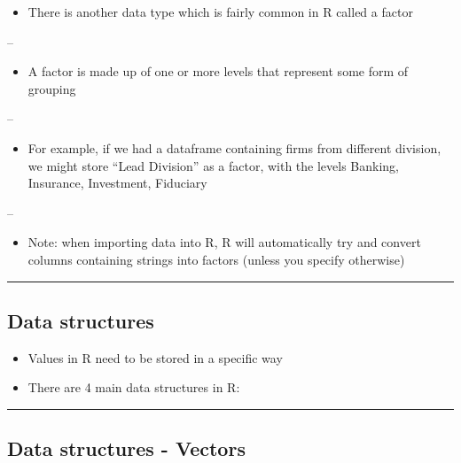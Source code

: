 \documentclass[]{article}
\providecommand{\tightlist}{%
  \setlength{\itemsep}{0pt}\setlength{\parskip}{0pt}}
\begin{document}
\begin{itemize}
\tightlist
\item
  There is another data type which is fairly common in R called a factor
\end{itemize}

--

\begin{itemize}
\tightlist
\item
  A factor is made up of one or more levels that represent some form of
  grouping
\end{itemize}

--

\begin{itemize}
\tightlist
\item
  For example, if we had a dataframe containing firms from different
  division, we might store ``Lead Division'' as a factor, with the
  levels Banking, Insurance, Investment, Fiduciary
\end{itemize}

--

\begin{itemize}
\tightlist
\item
  Note: when importing data into R, R will automatically try and convert
  columns containing strings into factors (unless you specify otherwise)
\end{itemize}

\begin{center}\rule{0.5\linewidth}{\linethickness}\end{center}

\hypertarget{data-structures}{%
\subsection{Data structures}\label{data-structures}}

\begin{itemize}
\tightlist
\item
  Values in R need to be stored in a specific way
\item
  There are 4 main data structures in R:
\end{itemize}

\begin{center}\rule{0.5\linewidth}{\linethickness}\end{center}

\hypertarget{data-structures---vectors}{%
\subsection{Data structures - Vectors}\label{data-structures---vectors}}
\end{document}
